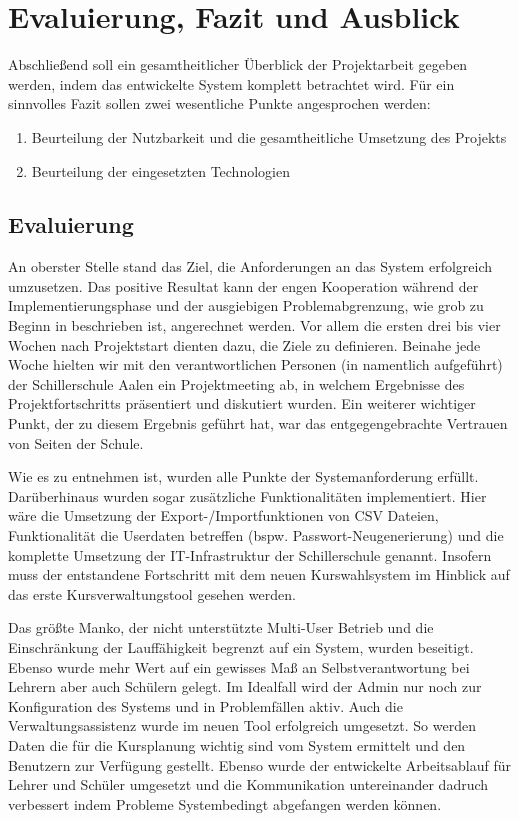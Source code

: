 \section{Evaluierung, Fazit und Ausblick}\label{sec:Fazit und Ausblick}

Abschließend soll ein gesamtheitlicher Überblick der Projektarbeit gegeben werden, indem das entwickelte System komplett betrachtet wird.
Für ein sinnvolles Fazit sollen zwei wesentliche Punkte angesprochen werden:
\begin{enumerate}
  \item Beurteilung der Nutzbarkeit und die gesamtheitliche Umsetzung des Projekts
  \item Beurteilung der eingesetzten Technologien
\end{enumerate}

\subsection{Evaluierung}

An oberster Stelle stand das Ziel, die Anforderungen an das System erfolgreich umzusetzen.
Das positive Resultat kann der engen Kooperation während der Implementierungsphase und der ausgiebigen Problemabgrenzung, wie grob zu Beginn in  beschrieben ist, angerechnet werden.
Vor allem die ersten drei bis vier Wochen nach Projektstart dienten dazu, die Ziele zu definieren. Beinahe jede Woche hielten wir mit den verantwortlichen Personen (in  namentlich aufgeführt) der Schillerschule Aalen ein Projektmeeting ab, in welchem Ergebnisse des Projektfortschritts präsentiert und diskutiert wurden.
Ein weiterer wichtiger Punkt, der zu diesem Ergebnis geführt hat, war das entgegengebrachte Vertrauen von Seiten der Schule.

Wie es  zu entnehmen ist, wurden alle Punkte der Systemanforderung erfüllt. Darüberhinaus wurden sogar zusätzliche Funktionalitäten implementiert.
Hier wäre die Umsetzung der Export-/Importfunktionen von CSV Dateien, Funktionalität die Userdaten betreffen (bspw. Passwort-Neugenerierung) und die komplette Umsetzung der \ac{IT}-Infrastruktur der Schillerschule genannt. 
Insofern muss der entstandene Fortschritt mit dem neuen Kurswahlsystem im Hinblick auf das erste Kursverwaltungstool gesehen werden.

Das größte Manko, der nicht unterstützte Multi-User Betrieb und die Einschränkung der Lauffähigkeit begrenzt auf ein System, wurden beseitigt. Ebenso wurde mehr Wert auf ein gewisses Maß an Selbstverantwortung bei Lehrern aber auch Schülern gelegt.
Im Idealfall wird der Admin nur noch zur Konfiguration des Systems und in Problemfällen aktiv.
Auch die Verwaltungsassistenz wurde im neuen Tool erfolgreich umgesetzt. So werden Daten die für die Kursplanung wichtig sind vom System ermittelt und den Benutzern zur Verfügung gestellt. 
Ebenso wurde der entwickelte Arbeitsablauf für Lehrer und Schüler umgesetzt und die Kommunikation untereinander dadruch verbessert indem Probleme Systembedingt abgefangen werden können.

